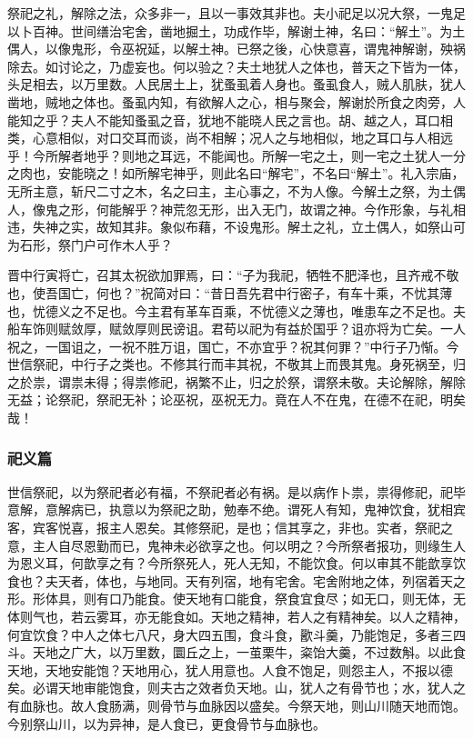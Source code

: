 \documentclass[]{article}
\begin{document}
祭祀之礼，解除之法，众多非一，且以一事效其非也。夫小祀足以况大祭，一鬼足以卜百神。世间缮治宅舍，凿地掘土，功成作毕，解谢土神，名曰：``解土''。为土偶人，以像鬼形，令巫祝延，以解土神。已祭之後，心快意喜，谓鬼神解谢，殃祸除去。如讨论之，乃虚妄也。何以验之？夫土地犹人之体也，普天之下皆为一体，头足相去，以万里数。人民居土上，犹蚤虱着人身也。蚤虱食人，贼人肌肤，犹人凿地，贼地之体也。蚤虱内知，有欲解人之心，相与聚会，解谢於所食之肉旁，人能知之乎？夫人不能知蚤虱之音，犹地不能晓人民之言也。胡、越之人，耳口相类，心意相似，对口交耳而谈，尚不相解；况人之与地相似，地之耳口与人相远乎！今所解者地乎？则地之耳远，不能闻也。所解一宅之土，则一宅之土犹人一分之肉也，安能晓之！如所解宅神乎，则此名曰``解宅''，不名曰``解土''。礼入宗庙，无所主意，斩尺二寸之木，名之曰主，主心事之，不为人像。今解土之祭，为土偶人，像鬼之形，何能解乎？神荒忽无形，出入无门，故谓之神。今作形象，与礼相违，失神之实，故知其非。象似布藉，不设鬼形。解土之礼，立土偶人，如祭山可为石形，祭门户可作木人乎？

晋中行寅将亡，召其太祝欲加罪焉，曰：``子为我祀，牺牲不肥泽也，且齐戒不敬也，使吾国亡，何也？''祝简对曰：``昔日吾先君中行密子，有车十乘，不忧其薄也，忧德义之不足也。今主君有革车百乘，不忧德义之薄也，唯患车之不足也。夫船车饰则赋敛厚，赋敛厚则民谤诅。君苟以祀为有益於国乎？诅亦将为亡矣。一人祝之，一国诅之，一祝不胜万诅，国亡，不亦宜乎？祝其何罪？''中行子乃惭。今世信祭祀，中行子之类也。不修其行而丰其祝，不敬其上而畏其鬼。身死祸至，归之於祟，谓祟未得；得祟修祀，祸繁不止，归之於祭，谓祭未敬。夫论解除，解除无益；论祭祀，祭祀无补；论巫祝，巫祝无力。竟在人不在鬼，在德不在祀，明矣哉！

\hypertarget{header-n864}{%
\subsubsection{祀义篇}\label{header-n864}}

世信祭祀，以为祭祀者必有福，不祭祀者必有祸。是以病作卜祟，祟得修祀，祀毕意解，意解病已，执意以为祭祀之助，勉奉不绝。谓死人有知，鬼神饮食，犹相宾客，宾客悦喜，报主人恩矣。其修祭祀，是也；信其享之，非也。实者，祭祀之意，主人自尽恩勤而已，鬼神未必欲享之也。何以明之？今所祭者报功，则缘生人为恩义耳，何歆享之有？今所祭死人，死人无知，不能饮食。何以审其不能歆享饮食也？夫天者，体也，与地同。天有列宿，地有宅舍。宅舍附地之体，列宿着天之形。形体具，则有口乃能食。使天地有口能食，祭食宜食尽；如无口，则无体，无体则气也，若云雾耳，亦无能食如。天地之精神，若人之有精神矣。以人之精神，何宜饮食？中人之体七八尺，身大四五围，食斗食，歠斗羹，乃能饱足，多者三四斗。天地之广大，以万里数，圜丘之上，一茧栗牛，粢饴大羹，不过数斛。以此食天地，天地安能饱？天地用心，犹人用意也。人食不饱足，则怨主人，不报以德矣。必谓天地审能饱食，则夫古之效者负天地。山，犹人之有骨节也；水，犹人之有血脉也。故人食肠满，则骨节与血脉因以盛矣。今祭天地，则山川随天地而饱。今别祭山川，以为异神，是人食已，更食骨节与血脉也。
\end{document}
